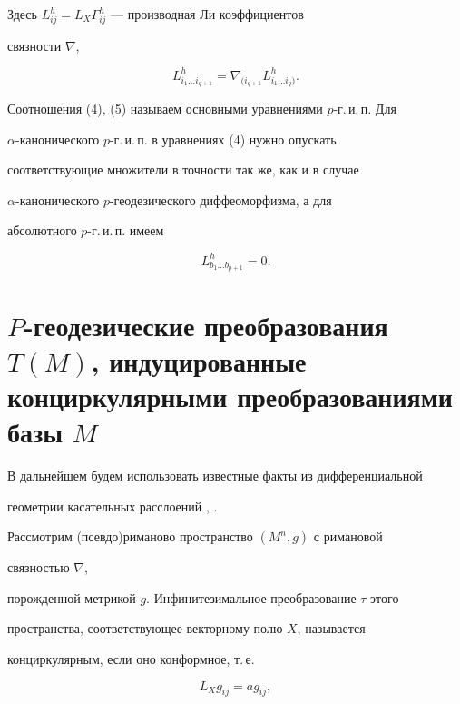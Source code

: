 Здесь $L^h_{ij}=L_X\Gamma^h_{ij}$ --- производная Ли коэффициентов


связности $\nabla$,


$$


L^h_{i_1\dots i_{q+1}}=\nabla_{(i_{q+1}}


L^h_{i_1\dots i_q)}.


$$





Соотношения (4), (5) называем основными уравнениями $p$-г.\,и.\,п. Для


$\alpha$-канонического $p$-г.\,и.\,п. в уравнениях (4) нужно опускать


соответствующие множители в точности так же, как и в случае


$\alpha$-канонического $p$-геодезического диффеоморфизма, а для


абсолютного $p$-г.\,и.\,п. имеем


\begin{equation}


L^h_{b_1\dots b_{p+1}}=0.


\end{equation}





\section{$P$-геодезические преобразования $T(M)$, индуцированные\protect\\


конциркулярными преобразованиями базы $M$}





В дальнейшем будем использовать известные факты из дифференциальной


геометрии касательных расслоений \cite{5}, \cite{6}.





Рассмотрим (псевдо)риманово пространство $(M^n,g)$ с римановой


связностью $\nabla$,


порожденной метрикой $g$. Инфинитезимальное преобразование $\tau$ этого


пространства, соответствующее векторному полю $X$, называется


конциркулярным, если оно конформное, т.\,е.


\begin{equation}


L_X g_{ij}=a g_{ij},


\end{equation}


